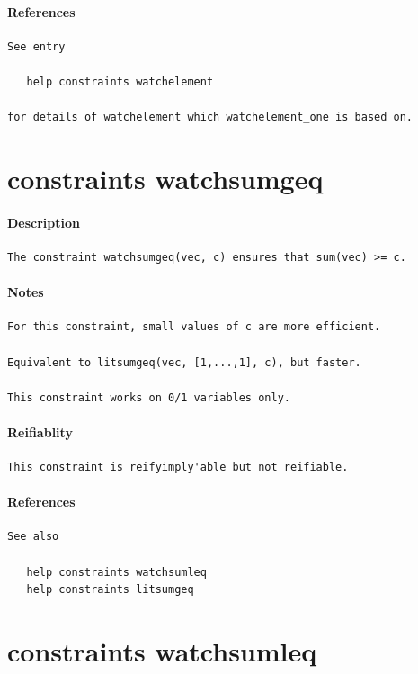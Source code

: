 \documentclass[oneside]{book}
\begin{document}
\paragraph{References}
{\footnotesize
\begin{verbatim}
See entry

   help constraints watchelement

for details of watchelement which watchelement_one is based on.
\end{verbatim}
}
\section{constraints watchsumgeq}
\paragraph{Description}
{\footnotesize
\begin{verbatim}
The constraint watchsumgeq(vec, c) ensures that sum(vec) >= c.
\end{verbatim}
}
\paragraph{Notes}
{\footnotesize
\begin{verbatim}
For this constraint, small values of c are more efficient.

Equivalent to litsumgeq(vec, [1,...,1], c), but faster.

This constraint works on 0/1 variables only.
\end{verbatim}
}
\paragraph{Reifiablity}
{\footnotesize
\begin{verbatim}
This constraint is reifyimply'able but not reifiable.
\end{verbatim}
}
\paragraph{References}
{\footnotesize
\begin{verbatim}
See also

   help constraints watchsumleq 
   help constraints litsumgeq
\end{verbatim}
}
\section{constraints watchsumleq}
\end{document}
